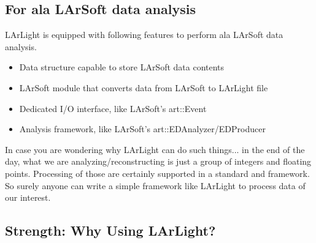 \subsection{For ala LArSoft data analysis}
LArLight is equipped with following features to perform ala LArSoft data analysis.
\begin{itemize}
\item Data structure capable to store LArSoft data contents
\item LArSoft module that converts data from LArSoft to LArLight \ROOT file
\item Dedicated I/O interface, like LArSoft's {\ttfamily art::Event}
\item Analysis framework, like LArSoft's {\ttfamily art::EDAnalyzer/EDProducer}
\end{itemize}

In case you are wondering why LArLight can do such things... in the end of the day, what we are analyzing/reconstructing is just a group of integers and floating points.
Processing of those are certainly supported in a standard \CPP and \ROOT framework.
So surely anyone can write a simple framework like LArLight to process data of our interest.

\subsection{Strength: Why Using LArLight?}


